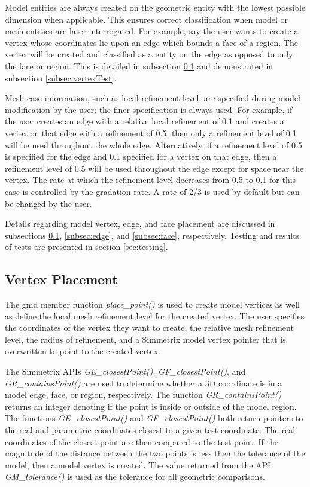\documentclass[a4paper, 12pt]{article}
\begin{document}
Model entities are always created on the geometric entity with the
lowest possible dimension when applicable. This ensures 
correct classification when model
or mesh entities are later interrogated. For example, say the
user wants to create a vertex whose coordinates lie upon an edge
which bounds a face of a region. The vertex will be created and 
classified as a entity on the edge as opposed to only the face or region. 
This is detailed in subsection \ref{subsec:vertex} and  demonstrated 
in subsection \ref{subsec:vertexTest}.

Mesh case information, such as local refinement level, are
specified during model modification by the user; the finer
specification is always used. For example, if the user 
creates an edge with a relative local refinement of 0.1
and creates a vertex on that edge with a refinement of 0.5, 
then only a refinement level of 0.1 will be used throughout 
the whole edge. Alternatively, if a refinement level of 0.5 
is specified for the edge and 0.1 specified for a vertex on that
edge, then a refinement level of 0.5 will be used throughout the 
edge except for space near the vertex. The rate at which the 
refinement level decreases from 0.5 to 0.1 for this case is controlled
by the gradation rate. A rate of 2/3 is used by default 
but can be changed by the user. 

Details regarding model vertex, edge, and face placement are 
discussed in subsections \ref{subsec:vertex}, \ref{subsec:edge}, 
and \ref{subsec:face}, respectively. Testing and results of tests
are presented in section \ref{sec:testing}.

\subsection{Vertex Placement} \label{subsec:vertex}
The gmd member function \emph{place\_point()} is used to create model
vertices as well as define the local mesh refinement level
for the created vertex.
The user specifies the coordinates of the vertex they want to create, the 
relative mesh refinement level, the radius of refinement, and a Simmetrix
model vertex pointer that is overwritten to point to the created vertex. 

The Simmetrix APIs \emph{GE\_closestPoint()}, \emph{GF\_closestPoint()}, 
and \emph{GR\_containsPoint()} are used to determine whether 
a 3D coordinate is in a model edge, face, or region, respectively. 
The function \emph{GR\_containsPoint()}
returns an integer denoting if the point 
is inside or outside of the model region. 
The functions \emph{GE\_closestPoint()} 
and \emph{GF\_closestPoint()} both return 
pointers to the real and parametric coordinates closest
to a given test coordinate. 
The real coordinates of the closest point are 
then compared to the test point.
If the magnitude of the distance between the two points is less then the 
tolerance of the model, then a model vertex is created. 
The value returned from the API \emph{GM\_tolerance()} is used as the 
tolerance for all geometric comparisons. 
\end{document}
